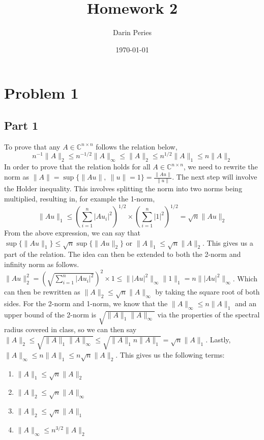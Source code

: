 \documentclass{report}
\title{Homework 2}
\author{Darin Peries}
\date{\today}
\begin{document}
\maketitle

\section*{Problem 1}

\subsection*{Part 1}

To prove that any $A\in\mathbb{C}^{n\times n}$ follows the relation below, 
$$n^{-1} \| A \|_2 \leq n^{-1/2} \| A \|_{\infty} \leq \| A \|_2 \leq n^{1/2} \|A\|_1 \leq n \|A\|_2$$
In order to prove that the relation holds for all $A\in\mathbb{C}^{n\times n}$,
we need to rewrite the norm as $\|A\|=\sup\{\|Au\|, \ \|u\|=1\}=\frac{\|Au\|}{\|u\|}$.
The next step will involve the Holder inequality. This involves splitting the norm into two
norms being multiplied, resulting in, for example the 1-norm, 
$$\|Au\|_1 \leq  (\sum\limits_{i=1}^n |Au_{i}|^2)^{1/2} \times (\sum\limits_{i=1}^n |1|^2)^{1/2}=\sqrt{n}\|Au\|_2 $$ 
From the above expression, we can say that $\sup\{\|Au\|_1\} \leq \sqrt{n}\sup\{\|Au\|_2\}$ or $\|A\|_1 \leq \sqrt{n}\|A\|_2$.
This gives us a part of the relation. The idea can then be extended to both the 2-norm and infinity norm as follows. 
$\|Au\|^2_2=(\sqrt{\sum\limits_{i=1}^n|Au_i|^2})^2 \times 1 \leq \||Au|^2\|_{\infty} \|1\|_1=n\||Au|^2\|_{\infty}$. Which can then
be rewritten as $\|A\|_2 \leq \sqrt{n}\|A\|_{\infty}$ by taking the square root of both sides. For the 2-norm and 1-norm,
we know that the $\|A\|_{\infty} \leq n\|A\|_1$ and an upper bound of the 2-norm is $\sqrt{\|A\|_1\|A\|_{\infty}}$  
via the properties of the spectral radius covered in class, so we can then say $\|A\|_2 \leq \sqrt{\|A\|_1\|A\|_{\infty}}\leq \sqrt{\|A\|_1n\|A\|_1}=\sqrt{n}\|A\|_1$. 
Lastly, $\|A\|_{\infty} \leq n\|A\|_1 \leq n \sqrt{n} \|A\|_2$. This gives us the following
terms:
\begin{enumerate}
    \centering
    \item $\|A\|_1 \leq \sqrt{n} \|A\|_2$
    \item $\|A\|_2 \leq \sqrt{n} \|A\|_{\infty}$
    \item $\|A\|_2 \leq \sqrt{n} \|A\|_1$
    \item $\|A\|_{\infty} \leq n^{3/2} \|A\|_2$
\end{enumerate}
\end{document}
